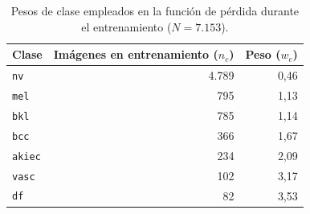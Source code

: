 \begin{table}[H]
  \centering
  \caption{Pesos de clase empleados en la función de pérdida durante el entrenamiento ($N = 7.153$).}
  \label{tab:pesos}
  \begin{tabularx}{\textwidth}{Yrr}
    \toprule
    Clase & Imágenes en entrenamiento ($n_c$) & Peso ($w_c$) \\
    \midrule
    \texttt{nv} & 4.789 & 0,46 \\
    \texttt{mel} & 795 & 1,13 \\
    \texttt{bkl} & 785 & 1,14 \\
    \texttt{bcc} & 366 & 1,67 \\
    \texttt{akiec} & 234 & 2,09 \\
    \texttt{vasc} & 102 & 3,17 \\
    \texttt{df} & 82 & 3,53 \\
    \bottomrule
  \end{tabularx}
\end{table}
